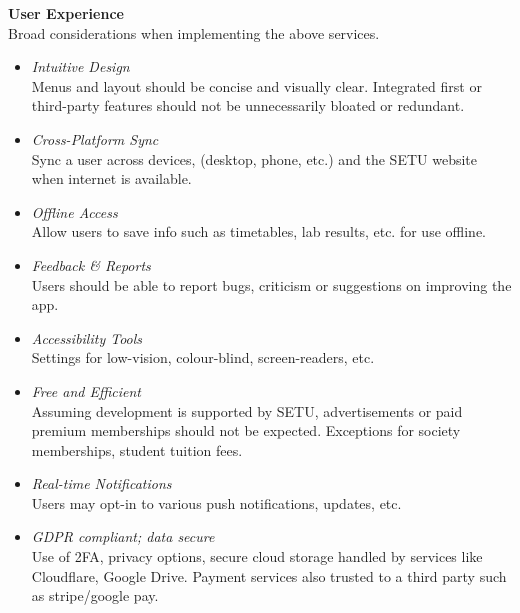 \textbf{User Experience}\\
Broad considerations when implementing the above services.
\begin{itemize}
  \item \textit{Intuitive Design}\\
        Menus and layout should be concise and visually clear. Integrated first or third-party features should not be unnecessarily bloated or redundant.
  \item \textit{Cross-Platform Sync}\\
        Sync a user across devices, (desktop, phone, etc.) and the SETU website when internet is available.
  \item \textit{Offline Access}\\
        Allow users to save info such as timetables, lab results, etc. for use offline.
  \item \textit{Feedback \& Reports}\\
        Users should be able to report bugs, criticism or suggestions on improving the app.
  \item \textit{Accessibility Tools}\\
       Settings for low-vision, colour-blind, screen-readers, etc. 
  \item \textit{Free and Efficient}\\
       Assuming development is supported by SETU, advertisements or paid premium memberships should not be expected. Exceptions for society memberships, student tuition fees.
  \item \textit{Real-time Notifications}\\
       Users may opt-in to various push notifications, updates, etc.
   \item \textit{GDPR compliant; data secure}\\
       Use of 2FA, privacy options, secure cloud storage handled by services like Cloudflare, Google Drive. Payment services also trusted to a third party such as stripe/google pay.
  \end{itemize}
  
